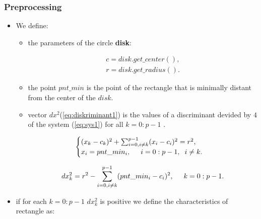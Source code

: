 \documentclass{report}
\begin{document}
	\subsubsection*{Preprocessing}
	\begin{itemize}
		\item We define:
		
		\begin{itemize}
			\item the parameters of the circle {\bfseries disk}:
			
			\begin{equation}
				\begin{gathered}
					c = disk.get\_center(),\\
					r = disk.get\_radius().
					\label{eq:paramdisk}
				\end{gathered}
			\end{equation}
			
			\item the point $pnt\_min$ is the point of the rectangle that is  minimally distant from the center of the $disk$.
			
			\item vector $dx^2$(\ref{eq:diskriminant1}) is the values of a discriminant devided by  $4$ of the system (\ref{eq:sys1}) for all $k = 0:p-1$ .
			
			\begin{equation}
				\begin{cases}
					(x_k - c_k)^2 + \sum_{i=0, i \neq k}^{p-1} (x_i - c_i)^2 = r^2,\\ 
					x_i = pnt\_min_i,\hspace*{5mm} i = 0:p-1, \hspace*{2mm}i \neq k.
				\end{cases}
				\label{eq:sys1}
			\end{equation}
			
			
			\begin{equation}
				\begin{gathered}
					dx_k^2 = r^2 - \sum_{i=0, i \neq k}^{p-1} (pnt\_min_i - c_i)^2, \hspace*{5mm} k = 0:p-1.\\
					\label{eq:diskriminant1}
				\end{gathered}
			\end{equation}
			
		\end{itemize}
		
		\item if for each $k = 0:p-1$ $dx_k^2$ is positive we define the characteristics of rectangle as: 


\end{itemize}
\end{document}
